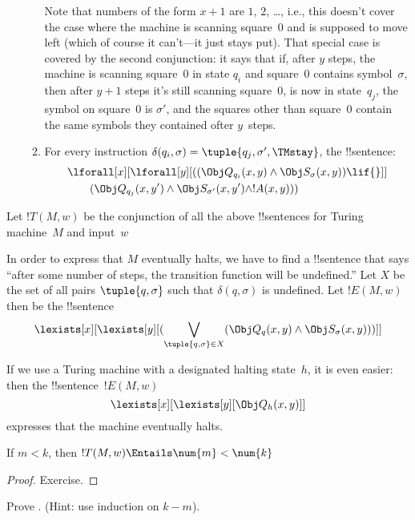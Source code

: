 \documentclass[../../../include/open-logic-section]{subfiles}
\begin{document}
\begin{enumerate}
\begin{enumerate}
Note that numbers of the form $x+1$ are $1$, $2$, \dots, i.e., this
doesn't cover the case where the machine is scanning square~$0$ and is
supposed to move left (which of course it can't---it just stays
put). That special case is covered by the second conjunction: it says
that if, after $y$ steps, the machine is scanning square~$0$ in state
$q_i$ and square~$0$ contains symbol~$\sigma$, then after $y+1$ steps
it's still scanning square~$0$, is now in state~$q_j$, the symbol on
square~$0$ is $\sigma'$, and the squares other than square~$0$ contain
the same symbols they contained ofter $y$~steps.
\item {} For every instruction $\delta(q_i, \sigma) =
  \tuple{q_j, \sigma', \TMstay}$, the !!{sentence}:
\begin{align*}
& \lforall[x][\lforall[y][(
   (\Obj Q_{q_i}(x, y) \land \Obj S_{\sigma}(x, y)) \lif {}]] \\
&\qquad   (\Obj Q_{q_j}(x, y') \land \Obj S_{\sigma'}(x, y') \land
!A(x, y)))
\end{align*}
\end{enumerate}
\end{enumerate}
Let $!T(M, w)$ be the conjunction of all the above !!{sentence}s for Turing
machine~$M$ and input~$w$

In order to express that $M$ eventually halts, we have to find a
!!{sentence} that says ``after some number of steps, the transition
function will be undefined.''  Let $X$ be the set of all pairs
$\tuple{q, \sigma}$ such that $\delta(q, \sigma)$ is undefined.  Let
$!E(M, w)$ then be the !!{sentence}
\[
\lexists[x][\lexists[y][(\bigvee_{\tuple{q, \sigma} \in
      X}(\Obj Q_q(x, y) \land \Obj S_\sigma(x, y)))]]
\]

If we use a Turing machine with a designated halting state~$h$, it
is even easier: then the !!{sentence}~$!E(M, w)$
\[
\lexists[x][\lexists[y][\Obj Q_h(x, y)]]
\]
expresses that the machine eventually halts.

\begin{prop}
If $m < k$, then $!T(M, w) \Entails \num{m} < \num{k}$
\end{prop}

\begin{proof}
Exercise.
\end{proof}

\begin{prob}
Prove .
(Hint: use induction on $k-m$).
\end{prob}
\end{document}
